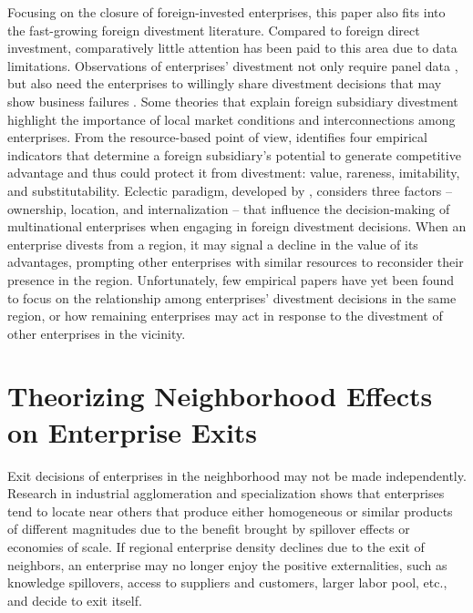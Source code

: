 Focusing on the closure of foreign-invested enterprises, this paper also fits into the fast-growing foreign divestment literature. Compared to foreign direct investment, comparatively little attention has been paid to this area due to data limitations. Observations of enterprises' divestment not only require panel data \cite{lee2010divestiture}, but also need the enterprises to willingly share divestment decisions that may show business failures \cite{benito1997divestment}. Some theories that explain foreign subsidiary divestment highlight the importance of local market conditions and interconnections among enterprises. From the resource-based point of view, \cite{barney1991firm} identifies four empirical indicators that determine a foreign subsidiary's potential to generate competitive advantage and thus could protect it from divestment: value, rareness, imitability, and substitutability. Eclectic paradigm, developed by \cite{dunning1980toward}, considers three factors – ownership, location, and internalization – that influence the decision-making of multinational enterprises when engaging in foreign divestment decisions. When an enterprise divests from a region, it may signal a decline in the value of its advantages, prompting other enterprises with similar resources to reconsider their presence in the region. Unfortunately, few empirical papers have yet been found to focus on the relationship among enterprises' divestment decisions in the same region, or how remaining enterprises may act in response to the divestment of other enterprises in the vicinity.

\section{Theorizing Neighborhood Effects on Enterprise Exits}

Exit decisions of enterprises in the neighborhood may not be made independently. Research in industrial agglomeration and specialization shows that enterprises tend to locate near others that produce either homogeneous or similar products of different magnitudes due to the benefit brought by spillover effects or economies of scale. If regional enterprise density declines due to the exit of neighbors, an enterprise may no longer enjoy the positive externalities, such as knowledge spillovers, access to suppliers and customers, larger labor pool, etc., and decide to exit itself.

